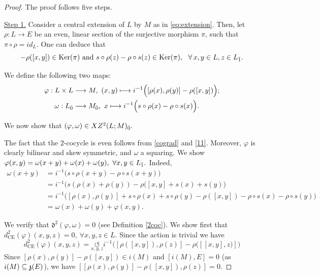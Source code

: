 \documentclass[12pt]{amsart}
\newcommand {\ce}{{\text{CE}}}
\begin{document}
\begin{proof}
The proof follows five steps.

\vspace{1 mm}

\noindent\underline{Step 1.} Consider a central extension of $L$ by $M$ as in \eqref{eq:extension}. Then, let $\rho:L \longrightarrow E$ be an even, linear section of the surjective morphism $\pi$, such that $\pi \circ \rho=id_{L}$. One can deduce that 
\begin{equation*}
[\rho(x),\rho(y)]-\rho([x,y]) \in \mathrm{Ker}(\pi) \text{ and } s\circ\rho(z)-\rho\circ s(z) \in \mathrm{Ker}(\pi), \ \ \forall \, x,y\in L, z \in L_{\od}.
\end{equation*}

\vspace{0.5 em}

\noindent We define the following two maps:
\begin{align}\label{11}
        \varphi: L\times L&\longrightarrow M,~ (x,y)\longmapsto i^{-1}\Bigl([\rho(x),\rho(y)]-\rho([x,y])\Bigl);\\
        \omega: L_{\bar0}&\longrightarrow M_{\bar0},~x\longmapsto i^{-1}\Bigl(s\circ\rho(x)-\rho\circ s(x)\Bigl).
\end{align}

\noindent We now show that $(\varphi,\omega)\in XZ^2(L;M)_{{\bar0}}.$

\vspace{0.5 em}

\noindent The fact that the $2$-cocycle is even follows from \eqref{cograd} and \eqref{11}. Moreover, $\varphi$ is clearly bilinear and skew symmetric, and $\omega$ a squaring. We show $\varphi(x,y)=\omega(x+y)+\omega(x)+\omega(y), \ \forall x,y \in L_{\od}.$ Indeed,
    \begin{align*}
        \omega(x+y)&=i^{-1}\bigl(s\circ\rho(x+y)-\rho\circ s(x+y)\bigr)\\
        &=i^{-1}\bigl(s(\rho(x)+\rho(y))-\rho([x,y]+s(x)+s(y)\bigr)\\
        &=i^{-1}\bigl([\rho(x),\rho(y)]+s\circ\rho(x)+s\circ\rho(y) -\rho([x,y])-\rho\circ s(x)- \rho \circ s(y)\bigr)\\
        &= \omega(x)+\omega(y)+\varphi(x,y). 
    \end{align*}
    
\vspace{0.5 em}

\noindent We verify that $\mathfrak{d}^2(\varphi,\omega) = 0$ (see Definition \eqref{2coc}). We show first that $d_{\ce}^2(\varphi)(x,y,z)=0, \ \forall x,y,z \in L$. Since the action is trivial we have 
\[d_{\ce}^2(\varphi)(x,y,z)= \underset{x,y,z}{\circlearrowleft}i^{-1}\bigl([\rho([x,y]),\rho(z)]-\rho([[x,y],z)]\bigr)\]
Since $[\rho(x),\rho(y)]-\rho([x,y])\in i(M)$ and $[i(M),E]=0$ (as $i(M)\subseteq {\mathfrak{z}}(E)$), we have $[[\rho(x),\rho(y)]-\rho([x,y]),\rho(z)]=0$. 


\end{proof}
\end{document}
